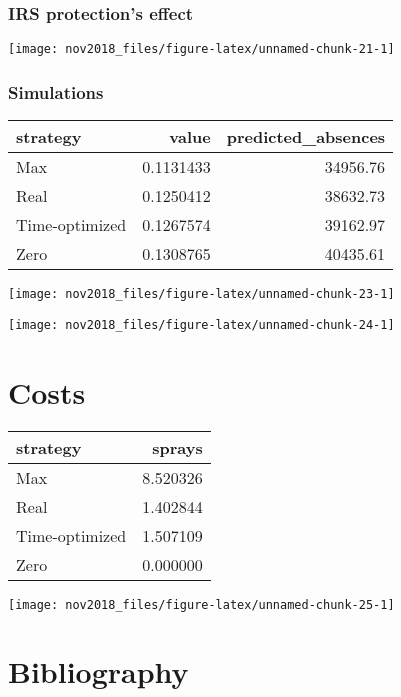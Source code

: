 \documentclass[]{article}
\begin{document}
\subsubsection{IRS protection's effect}\label{irs-protections-effect}

\begin{center}\texttt{[image: nov2018\_files/figure-latex/unnamed-chunk-21-1]} \end{center}

\subsubsection{Simulations}\label{simulations}

\begin{tabular}{l|r|r}
\hline
strategy & value & predicted\_absences\\
\hline
Max & 0.1131433 & 34956.76\\
\hline
Real & 0.1250412 & 38632.73\\
\hline
Time-optimized & 0.1267574 & 39162.97\\
\hline
Zero & 0.1308765 & 40435.61\\
\hline
\end{tabular}

\begin{center}\texttt{[image: nov2018\_files/figure-latex/unnamed-chunk-23-1]} \end{center}

\begin{center}\texttt{[image: nov2018\_files/figure-latex/unnamed-chunk-24-1]} \end{center}

\section{Costs}\label{costs}

\begin{tabular}{l|r}
\hline
strategy & sprays\\
\hline
Max & 8.520326\\
\hline
Real & 1.402844\\
\hline
Time-optimized & 1.507109\\
\hline
Zero & 0.000000\\
\hline
\end{tabular}

\begin{center}\texttt{[image: nov2018\_files/figure-latex/unnamed-chunk-25-1]} \end{center}

\section{Bibliography}\label{bibliography}
\end{document}

